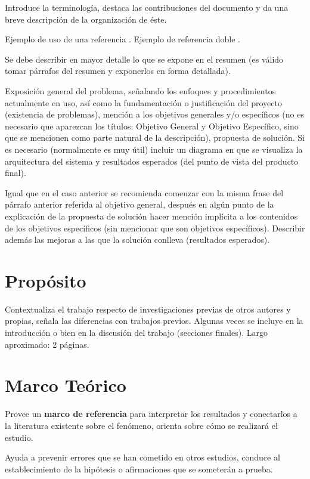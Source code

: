 \documentclass[letter,12pt]{report}
\newcommand\naranjo[1]{\textcolor[rgb]{1.00,0.36,0.06}{\textbf{#1}}}
\begin{document}
Introduce la terminología, destaca las contribuciones del documento y da una breve descripción de la organización de éste.

Ejemplo de uso de una referencia \cite{001}. Ejemplo de referencia doble \cite{001,002}.


Se debe describir en mayor detalle lo que se expone en el resumen (es válido tomar párrafos del resumen y exponerlos en forma detallada).

Exposición general del problema, señalando los enfoques y procedimientos actualmente en uso, así como la fundamentación o justificación del proyecto (existencia de problemas), mención a los objetivos generales y/o específicos (no es necesario que aparezcan los títulos: Objetivo General y Objetivo Específico, sino que se mencionen como parte natural de la descripción), propuesta de solución. Si es necesario (normalmente es muy útil) incluir un diagrama en que se visualiza la arquitectura del sistema y resultados esperados (del punto de vista del producto final).

Igual que en el caso anterior se recomienda comenzar con la misma frase del párrafo anterior referida al objetivo general, después en algún punto de la explicación de la propuesta de solución hacer mención implícita a los contenidos de los objetivos específicos (sin mencionar que son objetivos específicos). Describir además las mejoras a las que la solución conlleva (resultados esperados).


\section{Propósito}
Contextualiza el trabajo respecto de investigaciones previas de otros autores y propias, señala las diferencias con trabajos previos. Algunas veces se incluye en la introducción o bien en la discusión del trabajo (secciones finales). Largo aproximado: 2 páginas.

\section{Marco Teórico}

Provee un \naranjo{marco de referencia} para interpretar los resultados y conectarlos a la literatura existente sobre el fenómeno, orienta sobre cómo se realizará el estudio.

 Ayuda a prevenir errores que se han cometido en otros estudios, conduce al establecimiento de la hipótesis o afirmaciones que se someterán a prueba.
 
\end{document}
